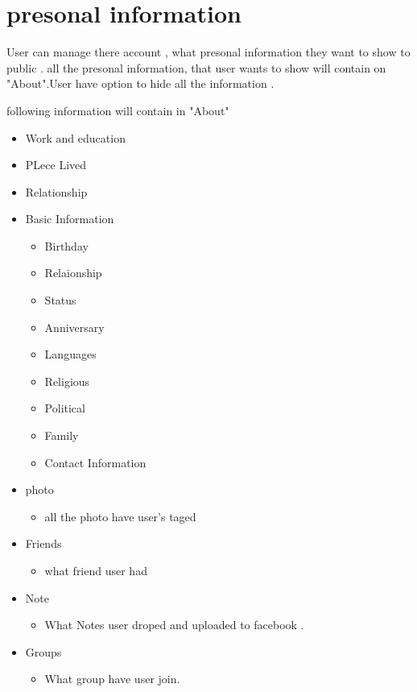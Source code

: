 
\section{presonal information}

User can manage there account , what presonal information they want to show to public .
all the presonal information,  that user wants to show will contain on "About".User have option to hide all the information .

following information will contain in "About"

\begin{itemize}

\item Work and education

\item PLece Lived

\item Relationship

\item Basic Information
	\begin{itemize}
		\item Birthday
		\item Relaionship
		\item Status
		\item Anniversary
		\item Languages
		\item Religious
		\item Political
		\item Family
		\item Contact Information
	\end{itemize}

\item photo 
	\begin{itemize}
	\item all the photo have user's taged 
	\end{itemize}

\item Friends
	\begin{itemize}
	\item what friend user had
	\end{itemize}

\item Note
	\begin{itemize}
	\item What Notes user droped and uploaded to facebook .
	\end{itemize}

\item Groups
	\begin{itemize}
	\item What group have user join.
	\end{itemize}


\end{itemize}
